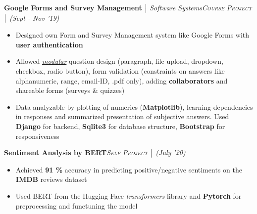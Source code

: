 \documentclass{article}
\begin{document}
\vspace{-5.25pt}
\textbf{Google Forms and Survey Management} $\bigm|$ {\it Software Systems}\hfill{\sl \small \textsc{Course Project} $\bigm|$ (Sept - Nov '19)}\\
\vspace{-18.5pt}
\begin{itemize}[itemsep = -1.25 mm, leftmargin=*]
    \item Designed own Form and Survey Management system like Google Forms with \textbf{user authentication}
    \item Allowed \textit{\underline{modular}} question design (paragraph, file upload, dropdown, checkbox, radio button), form validation (constraints\vspace{-0.25mm} on answers like alphanumeric, range, email-ID, .pdf only), adding \textbf{collaborators} and shareable forms (surveys \& quizzes)
    \item Data analyzable by plotting of numerics (\textbf{Matplotlib}), learning dependencies in responses and summarized presentation\vspace{-0.25mm} of subjective answers. Used \textbf{Django} for backend, \textbf{Sqlite3} for database structure, \textbf{Bootstrap} for responsiveness
\end{itemize}
\vspace{-5pt}
\textbf{Sentiment Analysis by BERT}\hfill{\sl \small \textsc{Self Project} $\bigm|$ (July '20)}\\
\vspace{-18.5pt}
\begin{itemize}[itemsep = -1.25 mm, leftmargin=*]
   \item Achieved {\bf 91 \%} accuracy in predicting positive/negative sentiments on the \textbf{IMDB} reviews dataset
    \item Used BERT from the Hugging Face {\it transformers} library and {\bf Pytorch} for preprocessing and funetuning the model
\end{itemize}
\end{document}
